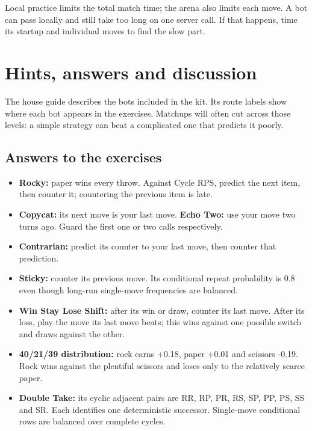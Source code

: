 \documentclass[11pt]{article}
\begin{document}
Local practice limits the total match time; the arena also limits each move. A bot can pass locally and still take too long on one server call. If that happens, time its startup and individual moves to find the slow part.
\par
\clearpage
\section*{Hints, answers and discussion}

\begin{context}
The house guide describes the bots included in the kit. Its route labels show where each bot appears in the exercises. Matchups will often cut across those levels: a simple strategy can beat a complicated one that predicts it poorly.

\end{context}

\subsection*{Answers to the exercises}

\begin{itemize}
\item \textbf{Rocky:} paper wins every throw. Against Cycle RPS, predict the next item, then counter it; countering the previous item is late.
\item \textbf{Copycat:} its next move is your last move. \textbf{Echo Two:} use your move two turns ago. Guard the first one or two calls respectively.
\item \textbf{Contrarian:} predict its counter to your last move, then counter that prediction.
\item \textbf{Sticky:} counter its previous move. Its conditional repeat probability is 0.8 even though long-run single-move frequencies are balanced.
\item \textbf{Win Stay Lose Shift:} after its win or draw, counter its last move. After its loss, play the move its last move beats; this wins against one possible switch and draws against the other.
\item \textbf{40/21/39 distribution:} rock earns +0.18, paper +0.01 and scissors -0.19. Rock wins against the plentiful scissors and loses only to the relatively scarce paper.
\item \textbf{Double Take:} its cyclic adjacent pairs are RR, RP, PR, RS, SP, PP, PS, SS and SR. Each identifies one deterministic successor. Single-move conditional rows are balanced over complete cycles.
\end{itemize}
\end{document}
